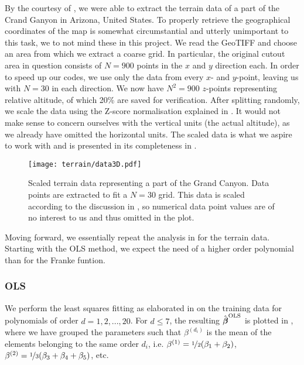     By the courtesy of \citep{EarthExplorer}, we were able to extract the terrain data of a part of the Crand Ganyon in Arizona, United States. To properly retrieve the geographical coordinates of the map is somewhat circumstantial and utterly unimportant to this task, we to not mind these in this project. We read the GeoTIFF and choose an area from which we extract a coarse grid. In particular, the original cutout area in question consists of $N=900$ points in the $x$ and $y$ direction each. In order to speed up our codes, we use only the data from every  $x$- and $y$-point, leaving us with $N=30$ in each direction. We now have $N^2=900$ $z$-points representing relative altitude, of which 20\% are saved for verification. After splitting randomly, we scale the data using the Z-score normalisation explained in . It would not make sense to concern ourselves with the vertical units (the actual altitude), as we already have omitted the horizontal units. The scaled data is what we aspire to work with and is presented in its completeness in .

    \begin{figure}
        \texttt{[image: terrain/data3D.pdf]}
        \caption{Scaled terrain data representing a part of the Grand Canyon. Data points are extracted to fit a $N=30$ grid. This data is scaled according to the discussion in , so numerical data point values are of no interest to us and thus omitted in the plot.}
        \label{fig:gc_data}
    \end{figure}

    Moving forward, we essentially repeat the analysis in  for the terrain data. Starting with the OLS method, we expect the need of a higher order polynomial than for the Franke funtion.

        \subsubsection{OLS}\label{sec:gc_olsanalysis}

        We perform the least squares fitting as elaborated in  on the training data for polynomials of order $d=1,2,..., 20$. For $d\leq 7$, the resulting $\hat{\boldsymbol{\beta}}^\text{OLS}$ is plotted in , where we have grouped the parameters such that $\beta^{(d_i)}$ is the mean of the elements belonging to the same order $d_i$, i.e. $\beta^{(1)} = \nicefrac{1}{2}(\beta_1 + \beta_2)$, $\beta^{(2)} = \nicefrac{1}{3}(\beta_3 + \beta_4 + \beta_5)$, etc. 

